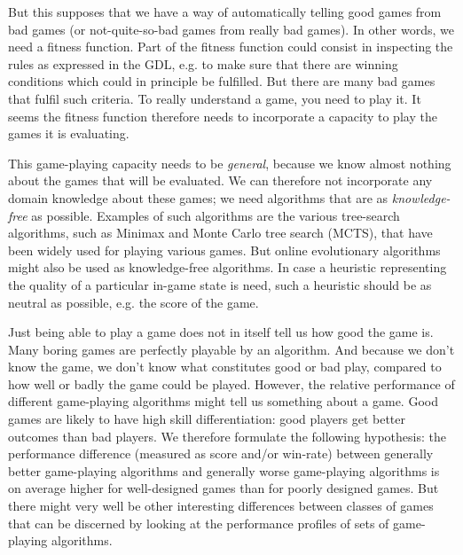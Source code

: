 \documentclass{llncs}
\begin{document}
But this supposes that we have a way of automatically telling good games from bad games (or not-quite-so-bad games from really bad games). In other words, we need a fitness function. Part of the fitness function could consist in inspecting the rules as expressed in the GDL, e.g. to make sure that there are winning conditions which could in principle be fulfilled. But there are many bad games that fulfil such criteria. To really understand a game, you need to play it. It seems the fitness function therefore needs to incorporate a capacity to play the games it is evaluating.

This game-playing capacity needs to be \emph{general}, because we know almost nothing about the games that will be evaluated. We can therefore not incorporate any domain knowledge about these games; we need algorithms that are as \emph{knowledge-free} as possible. Examples of such algorithms are the various tree-search algorithms, such as Minimax and Monte Carlo tree search (MCTS), that have been widely used for playing various games. But online evolutionary algorithms might also be used as knowledge-free algorithms. In case a heuristic representing the quality of a particular in-game state is need, such a heuristic should be as neutral as possible, e.g. the score of the game.

Just being able to play a game does not in itself tell us how good the game is. Many boring games are perfectly playable by an algorithm. And because we don't know the game, we don't know what constitutes good or bad play, compared to how well or badly the game could be played. However, the relative performance of different game-playing algorithms might tell us something about a game. Good games are likely to have high skill differentiation: good players get better outcomes than bad players. We therefore formulate the following hypothesis: the performance difference (measured as score and/or win-rate) between generally better game-playing algorithms and generally worse game-playing algorithms is on average higher for well-designed games than for poorly designed games. But there might very well be other interesting differences between classes of games that can be discerned by looking at the performance profiles of sets of game-playing algorithms.
\end{document}
